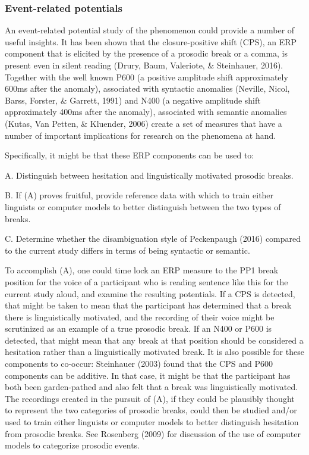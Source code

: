 \documentclass[11pt,oneside]{book}
\begin{document}
\hypertarget{erp}{%
\subsubsection{Event-related potentials}\label{erp}}

An event-related potential study of the phenomenon could provide a number of useful insights. It has been shown that the closure-positive shift (CPS), an ERP component that is elicited by the presence of a prosodic break or a comma, is present even in silent reading (Drury, Baum, Valeriote, \& Steinhauer, 2016). Together with the well known P600 (a positive amplitude shift approximately 600ms after the anomaly), associated with syntactic anomalies (Neville, Nicol, Barss, Forster, \& Garrett, 1991) and N400 (a negative amplitude shift approximately 400ms after the anomaly), associated with semantic anomalies (Kutas, Van Petten, \& Kluender, 2006) create a set of measures that have a number of important implications for research on the phenomena at hand.

Specifically, it might be that these ERP components can be used to:

A. Distinguish between hesitation and linguistically motivated prosodic breaks.

B. If (A) proves fruitful, provide reference data with which to train either linguists or computer models to better distinguish between the two types of breaks.

C. Determine whether the disambiguation style of Peckenpaugh (2016) compared to the current study differs in terms of being syntactic or semantic.

To accomplish (A), one could time lock an ERP measure to the PP1 break position for the voice of a participant who is reading sentence like this for the current study aloud, and examine the resulting potentials. If a CPS is detected, that might be taken to mean that the participant has determined that a break there is linguistically motivated, and the recording of their voice might be scrutinized as an example of a true prosodic break. If an N400 or P600 is detected, that might mean that any break at that position should be considered a hesitation rather than a linguistically motivated break. It is also possible for these components to co-occur: Steinhauer (2003) found that the CPS and P600 components can be additive. In that case, it might be that the participant has both been garden-pathed and also felt that a break was linguistically motivated. The recordings created in the pursuit of (A), if they could be plausibly thought to represent the two categories of prosodic breaks, could then be studied and/or used to train either linguists or computer models to better distinguish hesitation from prosodic breaks. See Rosenberg (2009) for discussion of the use of computer models to categorize prosodic events.
\end{document}
